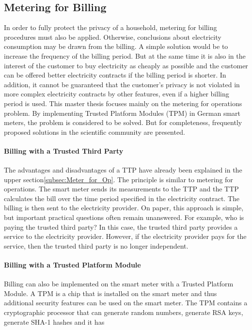 \subsection{Metering for Billing}
In order to fully protect the privacy of a household, metering for billing procedures must also be applied. Otherwise, conclusions about electricity consumption may be drawn from the billing. A simple solution would be to increase the frequency of the billing period. But at the same time it is also in the interest of the customer to buy electricity as cheaply as possible and the customer can be offered better electricity contracts if the billing period is shorter. In addition, it cannot be guaranteed that the customer's privacy is not violated in more complex electricity contracts by other features, even if a higher billing period is used. %
This master thesis focuses mainly on the metering for operations problem. 
By implementing Trusted Platform Modules (TPM) in German smart meters, the problem is considered to be solved. But for completeness, frequently proposed solutions in the scientific community are presented.\\
\\
\textbf{Billing with a Trusted Third Party}
\\
\\
The advantages and disadvantages of a TTP have already been explained in the upper section\ref{subsec:Meter_for_Op}. The principle is similar to metering for operations. The smart meter sends its measurements to the TTP and the TTP calculates the bill over the time period specified in the electricity contract. The billing is then sent to the electricity provider. On paper, this approach is simple, but important practical questions often remain unanswered. For example, who is paying the trusted third party? In this case, the trusted third party provides a service to the electricity provider. However, if the electricity provider pays for the service, then the trusted third party is no longer independent.\\
\\
\textbf{Billing with a Trusted Platform Module}
\\
\\
Billing can also be implemented on the smart meter with a Trusted Platform Module. A TPM is a chip that is installed on the smart meter and thus additional security features can be used on the smart meter. The TPM contains a cryptographic processor that can generate random numbers, generate RSA keys, generate SHA-1 hashes and it has
